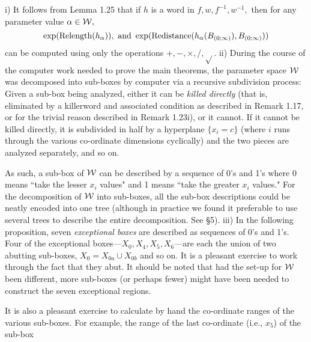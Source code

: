  i)  It follows from Lemma 1.25 that if $h$ is a word in $f,w,f^{-1},w^{-1},$ then for any
parameter value $\alpha\in {\cal W},$
$$\exp({\rm Relength}(h_\alpha)), \hbox{ and }
  \exp({\rm Redistance}(h_\alpha(B_{(0;\infty)}), B_{(0;\infty)}))$$ can be computed using only the
operations $+, -, \times, /, \sqrt{}.$
 ii) During the course of the computer work needed to prove the main theorems, the parameter space
${\cal W}$ was decomposed into sub-boxes by computer via a recursive subdivision process:
Given a sub-box  being analyzed, either it can be {\it killed directly} (that is, eliminated by a killerword and associated condition as described in
Remark 1.17, or for the trivial reason described in Remark 1.23i), or it cannot.  
If it cannot be killed directly, it is subdivided in half by a hyperplane
$\{x_i = c \}$ (where $i$ runs through the various co-ordinate dimensions
cyclically) and the two pieces are analyzed separately, and so on. 

As such, a sub-box of ${\cal W}$ can be described by a sequence of 0's and 1's where 0 means ``take the lesser $x_i$ values" and 1 means ``take the greater $x_i$ values."  
For the decomposition of ${\cal W}$ into sub-boxes, all the 
sub-box descriptions could be neatly encoded into one tree (although in practice we found it preferable to use several trees to describe the entire
decomposition.  See \S 5).
iii) In the following proposition, seven {\it exceptional boxes} are described as sequences of 0's and 1's.  
Four of the exceptional boxes---$X_0, X_4, X_5, X_6$---are each the union of two abutting sub-boxes, $X_0 = X_{0a} \cup X_{0b}$ and so on.  It is a pleasant exercise to work through the fact that they abut.  
It should be noted that had the set-up for ${\cal W}$ been different, more sub-boxes (or perhaps fewer) might have been needed to construct the seven
exceptional regions. 

It is also a pleasant exercise to calculate by hand the co-ordinate ranges of the various sub-boxes.  For example, the range of the last co-ordinate (i.e., $x_5$) of the sub-box 
\eject

